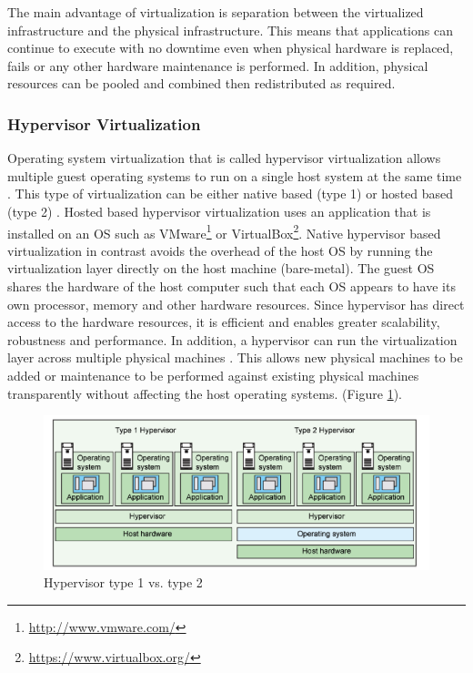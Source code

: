 \documentclass[a4paper,11pt,twoside]{report}
\begin{document}
The main advantage of virtualization is separation between the virtualized infrastructure and the physical infrastructure. This means that applications can continue to execute with no downtime even when physical hardware is replaced, fails or any other hardware maintenance is performed. In addition, physical resources can be pooled and combined then redistributed as required.

\subsubsection*{Hypervisor Virtualization}
Operating system virtualization that is called hypervisor virtualization allows multiple guest operating systems to run on a single host system at the same time \cite{Hypervisors2}. This type of virtualization can be either native based (type 1) or hosted based (type 2) \cite{Hypervisors}. Hosted based hypervisor virtualization uses an application that is installed on an OS such as VMware\footnote{\url{http://www.vmware.com/}} or VirtualBox\footnote{\url {https://www.virtualbox.org/}}. Native hypervisor based virtualization in contrast avoids the overhead of the host OS by running the virtualization layer directly on the host machine (bare-metal). The guest OS shares the hardware of the host computer such that each OS appears to have its own processor, memory and other hardware resources. Since hypervisor has direct access to the hardware resources, it is efficient and enables greater scalability, robustness and performance. In addition, a hypervisor can run the virtualization layer across multiple physical machines \cite{Hypervisors}. This allows new physical machines to be added or maintenance to be performed against existing physical machines transparently without affecting the host operating systems. (Figure \ref{Hypervisor}).\bigskip

\begin{figure}[!ht]
  \centering
     \includegraphics[scale=1]{Hypervisor}
  \caption{Hypervisor type 1 vs. type 2 \cite{Hypervisors}}
  \label{Hypervisor}
\end{figure}
\end{document}

